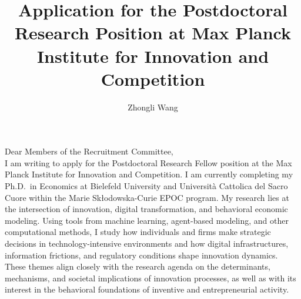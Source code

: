 \documentclass{nfr}
\title{Application for the Postdoctoral Research Position at Max Planck Institute for Innovation and Competition}
\author{Zhongli Wang}
\begin{document}

% 
% 
% 
% 


\maketitle


\noindent Dear Members of the Recruitment Committee,\\[0.2cm]

I am writing to apply for the Postdoctoral Research Fellow position at the Max Planck Institute for Innovation and Competition. 
I am currently completing my Ph.D.\ in Economics at Bielefeld University and Università Cattolica del Sacro Cuore within the Marie Skłodowska-Curie EPOC program. 
My research lies at the intersection of innovation, digital transformation, and behavioral economic modeling. 
Using tools from machine learning, agent-based modeling, and other computational methods, I study how individuals and firms make strategic decisions in technology-intensive environments and how digital infrastructures, information frictions, and regulatory conditions shape innovation dynamics. 
These themes align closely with the research agenda on the determinants, mechanisms, and societal implications of innovation processes, as well as with its interest in the behavioral foundations of inventive and entrepreneurial activity.\\
\end{document}
